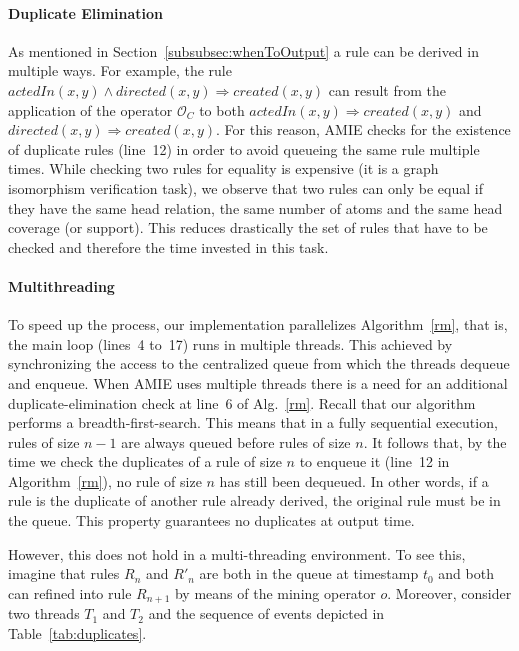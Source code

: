 \paragraph{Duplicate Elimination} \label{subsec:duplicateElimination}
As mentioned in Section~\ref{subsubsec:whenToOutput} a rule can be derived in multiple ways.
For example, the rule $actedIn(x,y) \wedge directed(x,y) \Rightarrow created(x,y)$ can result from the application
of the operator $\mathcal{O}_C$ to both $actedIn(x,y) \Rightarrow created(x,y)$ and $directed(x,y) \Rightarrow created(x,y)$.
For this reason, AMIE checks for the existence of duplicate rules (line~12) in order to avoid queueing the same rule multiple times.
While checking two rules for equality is expensive (it is a graph isomorphism verification task), 
we observe that two rules can only be equal if they have the same head relation, the same number of atoms and
the same head coverage (or support). This reduces drastically the set of rules that have to be checked and therefore
the time invested in this task.


\paragraph{Multithreading}
To speed up the process, our implementation parallelizes Algorithm~\ref{rm}, that is, the main loop (lines~4 to~17) runs in multiple threads. 
This achieved by synchronizing the access to the centralized queue from which the threads dequeue and enqueue.
When AMIE uses multiple threads there is a need for an additional duplicate-elimination check at line~6 of Alg.~\ref{rm}.
Recall that our algorithm performs a breadth-first-search. 
This means that in a fully sequential execution, rules of size $n-1$ are always queued before rules of size $n$. 
It follows that, by the time we check the duplicates of a rule of size $n$ to enqueue it (line~12 in Algorithm~\ref{rm}), 
no rule of size $n$ has still been dequeued. In other words, if a rule is the duplicate 
of another rule already derived, the original rule must be in the queue. This property guarantees no duplicates at output time. 

However, this does not hold in a multi-threading environment. 
To see this, imagine that rules 
$R_n$ and $R'_n$ are both in the queue at timestamp $t_0$ and both can refined into rule $R_{n+1}$
by means of the mining operator $o$. 
Moreover, consider two threads $T_1$ and $T_2$ and the sequence of events depicted in Table~\ref{tab:duplicates}.

